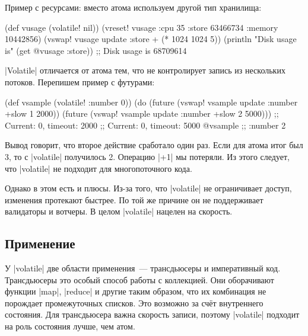 Пример с ресурсами: вместо атома используем другой тип хранилища:

\begin{english}
  \begin{clojure}
(def vusage (volatile! nil))
(vreset! vusage
         {:cpu 35
          :store 63466734
          :memory 10442856})
(vswap! vusage update :store + (* 1024 1024 5))
(println "Disk usage is" (get @vusage :store))
;; Disk usage is 68709614
  \end{clojure}
\end{english}

\spverb|Volatile| отличается от атома тем, что не контролирует запись из
нескольких потоков. Перепишем пример с футурами:

\begin{english}
  \begin{clojure}
(def vsample (volatile! {:number 0}))
(do (future (vswap! vsample update :number +slow 1 2000))
    (future (vswap! vsample update :number +slow 2 5000)))
;; Current: 0, timeout: 2000
;; Current: 0, timeout: 5000
@vsample ;; {:number 2}
  \end{clojure}
\end{english}


Вывод говорит, что второе действие сработало один раз. Если для атома итог был
3, то с \spverb|volatile| получилось 2. Операцию \spverb|+1| мы потеряли. Из
этого следует, что \spverb|volatile| не подходит для многопоточного кода.

Однако в этом есть и плюсы. Из-за того, что \spverb|volatile| не ограничивает
доступ, изменения протекают быстрее. По той же причине он не поддерживает
валидаторы и вотчеры. В целом \spverb|volatile| нацелен на скорость.

\subsection{Применение}


У \spverb|volatile| две области применения~--- трансдьюсеры и императивный
код. Трансдьюсеры это особый способ работы с коллекцией. Они оборачивают функции
\spverb|map|, \spverb|reduce| и другие таким образом, что их комбинация не
порождает промежуточных списков. Это возможно за сч\"{е}т внутреннего состояния. Для
трансдьюсера важна скорость записи, поэтому \spverb|volatile| подходит на роль
состояния лучше, чем атом.

